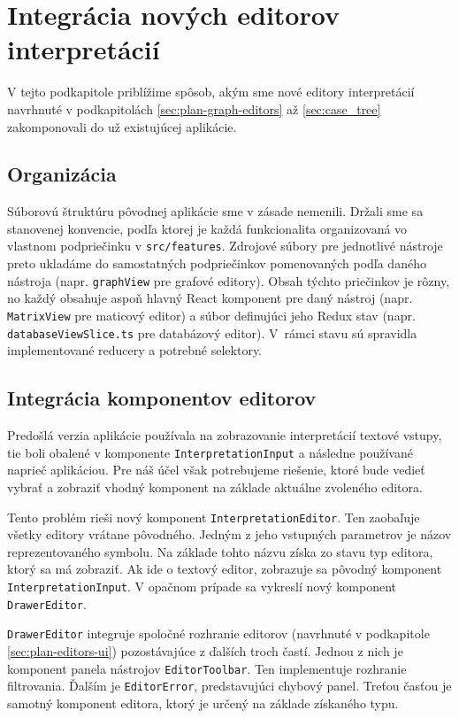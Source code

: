 \section{Integrácia nových editorov interpretácií}
V tejto podkapitole priblížime spôsob, akým sme nové editory interpretácií navrhnuté v podkapitolách \ref{sec:plan-graph-editors} až \ref{sec:case_tree} zakomponovali do už existujúcej aplikácie.

\subsection{Organizácia}
Súborovú štruktúru pôvodnej aplikácie sme v zásade nemenili. Držali sme sa stanovenej konvencie, podľa ktorej je každá funkcionalita organizovaná vo vlastnom podpriečinku v \texttt{src/features}. Zdrojové súbory pre jednotlivé nástroje preto ukladáme do samostatných podpriečinkov pomenovaných podľa daného nástroja (napr. \texttt{graphView} pre grafové editory). Obsah týchto priečinkov je rôzny, no každý obsahuje aspoň hlavný React komponent pre daný nástroj (napr. \texttt{MatrixView} pre maticový editor) a súbor definujúci jeho Redux stav (napr. \texttt{databaseViewSlice.ts} pre databázový editor). V~rámci stavu sú spravidla implementované reducery a potrebné selektory.

\subsection{Integrácia komponentov editorov}
\label{sec:editor_integration}
Predošlá verzia aplikácie používala na zobrazovanie interpretácií textové vstupy, tie boli obalené v komponente \texttt{InterpretationInput} a následne používané naprieč aplikáciou. Pre náš účel však potrebujeme riešenie, ktoré bude vedieť vybrať a zobraziť vhodný komponent na základe aktuálne zvoleného editora.

Tento problém rieši nový komponent \texttt{InterpretationEditor}. Ten zaobaľuje všetky editory vrátane pôvodného. Jedným z jeho vstupných parametrov je názov reprezentovaného symbolu. Na základe tohto názvu získa zo stavu typ editora, ktorý sa má zobraziť. Ak ide o textový editor, zobrazuje sa pôvodný komponent \texttt{InterpretationInput}. V opačnom prípade sa vykreslí nový komponent \texttt{DrawerEditor}.

\texttt{DrawerEditor} integruje spoločné rozhranie editorov (navrhnuté v podkapitole \ref{sec:plan-editors-ui}) pozostávajúce z ďalších troch častí. Jednou z nich je komponent panela nástrojov \texttt{EditorToolbar}. Ten implementuje rozhranie filtrovania. Ďalším je \texttt{EditorError}, predstavujúci chybový panel. Treťou časťou je samotný komponent editora, ktorý je určený na základe získaného typu.

